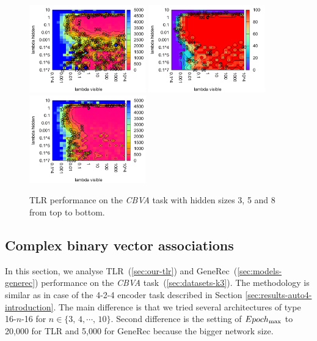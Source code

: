 \begin{figure}[H]
  \includegraphics[width=0.45\textwidth]{img/k3/tlr-5-epoch.pdf}  
  \includegraphics[width=0.45\textwidth]{img/k3/tlr-8-success.pdf} 
  \includegraphics[width=0.45\textwidth]{img/k3/tlr-8-epoch.pdf}    
  \caption{TLR performance on the \emph{CBVA} task with hidden sizes 3, 5 and 8 from top to bottom.}
  \label{fig:results-tlr-k3-performance}
\end{figure}

\subsection{Complex binary vector associations} 
\label{sec:results-k3}

In this section, we analyse TLR~(\ref{sec:our-tlr}) and GeneRec~(\ref{sec:models-generec}) performance on the \emph{CBVA} task~(\ref{sec:datasets-k3}). The methodology is similar as in case of the 4-2-4 encoder task described in Section \ref{sec:results-auto4-introduction}. The main difference is that we tried several architectures of type 16-$n$-16 for $n \in \{3,\,4,\cdots,\,10\}$. Second difference is the setting of $Epoch_{\rm max}$ to 20,000 for TLR and 5,000 for GeneRec because the bigger network size. 



